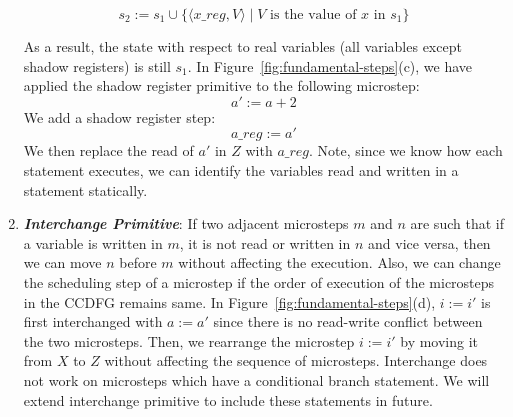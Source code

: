 \begin{enumerate}
$$ s_2 := s_1 \cup \{ \langle x\_reg, V \rangle \mid V  \text{ is the value of } \allowbreak  x \text{ in } s_1\} $$

As a result, the state with respect to real variables (all variables except shadow registers) is still $s_1$. 
In Figure~\ref{fig:fundamental-steps}(c), we have applied the shadow register primitive to the following microstep: 
$$a' := a + 2$$
We add a shadow register step: 
$$a\_reg := a'$$ 
We then replace the read of $a'$ in $Z$ with $a\_reg$. Note, since we know how each statement executes, we can identify the variables read and written in a statement statically.

\medskip
\item \textbf{\emph{Interchange Primitive}}: If two adjacent microsteps $m$ and $n$ are such that if a variable is written in $m$, it is not read or written in $n$ and vice versa, then we can move $n$ before $m$ without affecting the execution. Also, we can change the scheduling step of a microstep if the order of execution of the microsteps in the CCDFG remains same. In Figure~\ref{fig:fundamental-steps}(d),  
$i := i'$ is first interchanged with $a := a'$ since there is no read-write conflict between the two microsteps. Then, we rearrange the microstep $i := i'$ by moving it from $X$ to $Z$ without affecting the sequence of microsteps. Interchange does not work on microsteps which have a conditional branch statement. We will extend interchange primitive to include these statements in future.

\end{enumerate}


